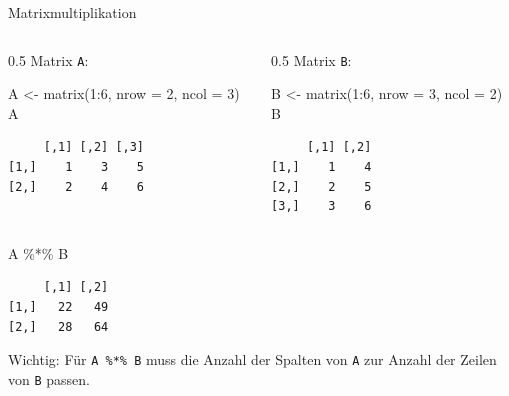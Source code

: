 \documentclass[
  10pt,
  ignorenonframetext,
  aspectratio=169,
]{beamer}
\newenvironment{Shaded}{}{}
\newcommand{\AttributeTok}[1]{\textcolor[rgb]{0.49,0.56,0.16}{#1}}
\newcommand{\DecValTok}[1]{\textcolor[rgb]{0.25,0.63,0.44}{#1}}
\newcommand{\FunctionTok}[1]{\textcolor[rgb]{0.02,0.16,0.49}{#1}}
\newcommand{\NormalTok}[1]{#1}
\newcommand{\OtherTok}[1]{\textcolor[rgb]{0.00,0.44,0.13}{#1}}
\newcommand{\SpecialCharTok}[1]{\textcolor[rgb]{0.25,0.44,0.63}{#1}}
\begin{document}
\begin{frame}[fragile]{Matrixmultiplikation}
\label{matrixmultiplikation}
\begin{columns}[T]
\begin{column}{0.5\linewidth}
Matrix \texttt{A}:

\begin{Shaded}
\begin{Highlighting}[]
\NormalTok{A }\OtherTok{\textless{}{-}} \FunctionTok{matrix}\NormalTok{(}\DecValTok{1}\SpecialCharTok{:}\DecValTok{6}\NormalTok{, }\AttributeTok{nrow =} \DecValTok{2}\NormalTok{, }\AttributeTok{ncol =} \DecValTok{3}\NormalTok{)}
\NormalTok{A}
\end{Highlighting}
\end{Shaded}

\begin{verbatim}
     [,1] [,2] [,3]
[1,]    1    3    5
[2,]    2    4    6
\end{verbatim}
\end{column}

\begin{column}{0.5\linewidth}
Matrix \texttt{B}:

\begin{Shaded}
\begin{Highlighting}[]
\NormalTok{B }\OtherTok{\textless{}{-}} \FunctionTok{matrix}\NormalTok{(}\DecValTok{1}\SpecialCharTok{:}\DecValTok{6}\NormalTok{, }\AttributeTok{nrow =} \DecValTok{3}\NormalTok{, }\AttributeTok{ncol =} \DecValTok{2}\NormalTok{)}
\NormalTok{B}
\end{Highlighting}
\end{Shaded}

\begin{verbatim}
     [,1] [,2]
[1,]    1    4
[2,]    2    5
[3,]    3    6
\end{verbatim}
\end{column}
\end{columns}

\begin{Shaded}
\begin{Highlighting}[]
\NormalTok{A }\SpecialCharTok{\%*\%}\NormalTok{ B}
\end{Highlighting}
\end{Shaded}

\begin{verbatim}
     [,1] [,2]
[1,]   22   49
[2,]   28   64
\end{verbatim}

Wichtig: Für \texttt{A\ \%*\%\ B} muss die Anzahl der Spalten von
\texttt{A} zur Anzahl der Zeilen von \texttt{B} passen.
\end{frame}
\end{document}
